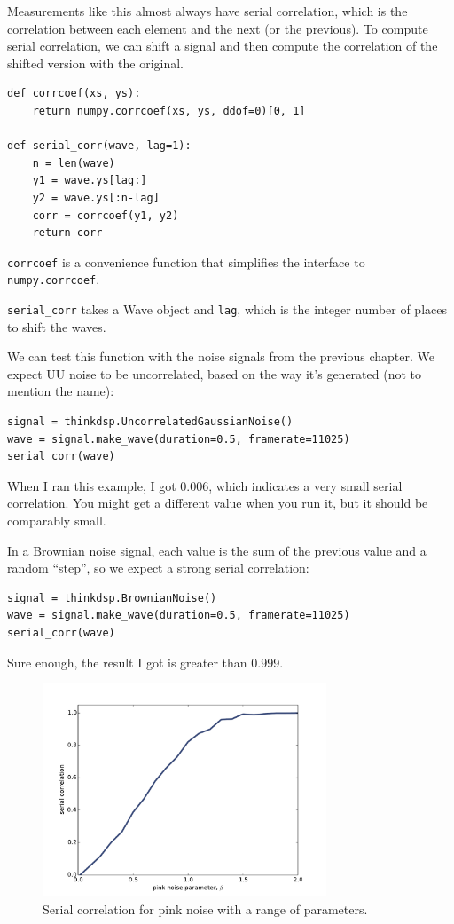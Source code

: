 \documentclass[12pt]{book}
\begin{document}
Measurements like this almost always have serial correlation, which
is the correlation between each element and the next (or the previous).
To compute serial correlation, we can shift a signal and then compute
the correlation of the shifted version with the original.

\begin{verbatim}
def corrcoef(xs, ys):
    return numpy.corrcoef(xs, ys, ddof=0)[0, 1]

def serial_corr(wave, lag=1):
    n = len(wave)
    y1 = wave.ys[lag:]
    y2 = wave.ys[:n-lag]
    corr = corrcoef(y1, y2)
    return corr
\end{verbatim}

{\tt corrcoef} is a convenience function that simplifies
the interface to {\tt numpy.corrcoef}.

\verb"serial_corr" takes a Wave object and
{\tt lag}, which is the integer number of places to shift the waves.

We can test this function with the noise signals from the previous
chapter.  We expect UU noise to be uncorrelated, based on the
way it's generated (not to mention the name):

\begin{verbatim}
signal = thinkdsp.UncorrelatedGaussianNoise()
wave = signal.make_wave(duration=0.5, framerate=11025)
serial_corr(wave)
\end{verbatim}

When I ran this example, I got 0.006, which indicates a very
small serial correlation.  You might get a different value when you run
it, but it should be comparably small.

In a Brownian noise signal, each value is the sum of the previous
value and a random ``step'', so we expect a strong serial
correlation:

\begin{verbatim}
signal = thinkdsp.BrownianNoise()
wave = signal.make_wave(duration=0.5, framerate=11025)
serial_corr(wave)
\end{verbatim}

Sure enough, the result I got is greater than 0.999.

\begin{figure}
\centerline{\includegraphics[height=2.5in]{figs/autocorr3.pdf}}
\caption{Serial correlation for pink noise with a range of
parameters.}
\label{fig.autocorr3}
\end{figure}
\end{document}
